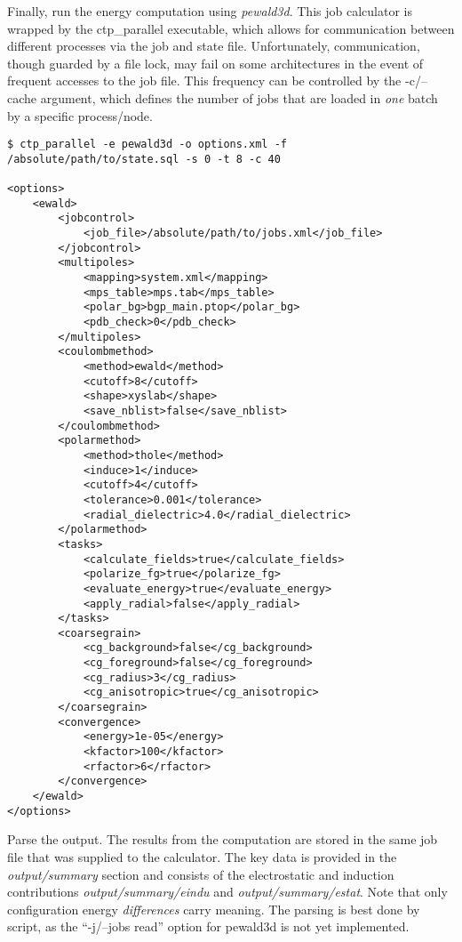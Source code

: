 Finally, run the energy computation using {\em pewald3d}. This job calculator is wrapped by the ctp\_parallel executable, which allows for communication between different processes via the job and state file. Unfortunately, communication, though guarded by a file lock, may fail on some architectures in the event of frequent accesses to the job file. This frequency can be controlled by the -c/--cache argument, which defines the number of jobs that are loaded in {\em one} batch by a specific process/node.
\begin{verbatim}
$ ctp_parallel -e pewald3d -o options.xml -f /absolute/path/to/state.sql -s 0 -t 8 -c 40

<options>
    <ewald>
        <jobcontrol>
            <job_file>/absolute/path/to/jobs.xml</job_file>
        </jobcontrol>
        <multipoles>
            <mapping>system.xml</mapping>
            <mps_table>mps.tab</mps_table>
            <polar_bg>bgp_main.ptop</polar_bg>
            <pdb_check>0</pdb_check>
        </multipoles>
        <coulombmethod>
            <method>ewald</method>
            <cutoff>8</cutoff>
            <shape>xyslab</shape>
            <save_nblist>false</save_nblist>
        </coulombmethod>
        <polarmethod>
            <method>thole</method>
            <induce>1</induce>
            <cutoff>4</cutoff>
            <tolerance>0.001</tolerance>
            <radial_dielectric>4.0</radial_dielectric>
        </polarmethod>
        <tasks>
            <calculate_fields>true</calculate_fields>
            <polarize_fg>true</polarize_fg>
            <evaluate_energy>true</evaluate_energy>
            <apply_radial>false</apply_radial>
        </tasks>
        <coarsegrain>
            <cg_background>false</cg_background>
            <cg_foreground>false</cg_foreground>
            <cg_radius>3</cg_radius>
            <cg_anisotropic>true</cg_anisotropic>
        </coarsegrain>
        <convergence>
            <energy>1e-05</energy>
            <kfactor>100</kfactor>
            <rfactor>6</rfactor>
        </convergence>
    </ewald>
</options>
\end{verbatim}

Parse the output. The results from the computation are stored in the same job file that was supplied to the calculator. The key data is provided in the {\em output/summary} section and consists of the electrostatic and induction contributions {\em output/summary/eindu} and {\em output/summary/estat}. Note that only configuration energy {\em differences} carry meaning. The parsing is best done by script, as the ``-j/--jobs read'' option for pewald3d is not yet implemented.

